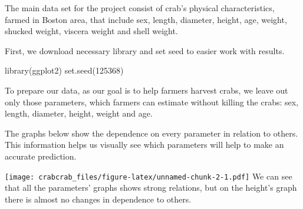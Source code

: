 \documentclass[
]{article}
\newenvironment{Shaded}{\begin{snugshade}}{\end{snugshade}}
\newcommand{\AttributeTok}[1]{\textcolor[rgb]{0.77,0.63,0.00}{#1}}
\newcommand{\CommentTok}[1]{\textcolor[rgb]{0.56,0.35,0.01}{\textit{#1}}}
\newcommand{\ConstantTok}[1]{\textcolor[rgb]{0.00,0.00,0.00}{#1}}
\newcommand{\DecValTok}[1]{\textcolor[rgb]{0.00,0.00,0.81}{#1}}
\newcommand{\FunctionTok}[1]{\textcolor[rgb]{0.00,0.00,0.00}{#1}}
\newcommand{\NormalTok}[1]{#1}
\newcommand{\OtherTok}[1]{\textcolor[rgb]{0.56,0.35,0.01}{#1}}
\newcommand{\SpecialCharTok}[1]{\textcolor[rgb]{0.00,0.00,0.00}{#1}}
\newcommand{\StringTok}[1]{\textcolor[rgb]{0.31,0.60,0.02}{#1}}
\begin{document}
The main data set for the project consist of crab's physical
characteristics, farmed in Boston area, that include sex, length,
diameter, height, age, weight, shucked weight, viscera weight and shell
weight.

First, we download necessary library and set seed to easier work with
results.

\begin{Shaded}
\begin{Highlighting}[]
\FunctionTok{library}\NormalTok{(ggplot2)}
\FunctionTok{set.seed}\NormalTok{(}\DecValTok{125368}\NormalTok{)}
\end{Highlighting}
\end{Shaded}

To prepare our data, as our goal is to help farmers harvest crabs, we
leave out only those parameters, which farmers can estimate without
killing the crabs: sex, length, diameter, height, weight and age.

The graphs below show the dependence on every parameter in relation to
others. This information helps us visually see which parameters will
help to make an accurate prediction.

\begin{Shaded}
\end{Shaded}

\texttt{[image: crabcrab\_files/figure-latex/unnamed-chunk-2-1.pdf]} We
can see that all the parameters' graphs shows strong relations, but on
the height's graph there is almost no changes in dependence to others.

\begin{Shaded}
\end{Shaded}
\end{document}

